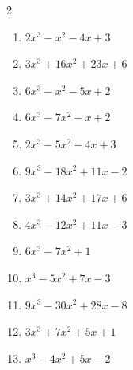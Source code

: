 \begin{multicols}{2}
\begin{enumerate}

  \item $2x^{3}-x^{2}-4x+3$


  \item $3x^{3}+16x^{2}+23x+6$

        \phantom{$=(3x+1)(x+2)(x+3)$}

\columnbreak %

  \item $6x^{3}-x^{2}-5x+2$

        \phantom{$=(2x-1)(3x-2)(x+1)$}

  \item $6x^{3}-7x^{2}-x+2$

        \phantom{$=(2x+1)(3x-2)(x-1)$}

  \item $2x^{3}-5x^{2}-4x+3$

        \phantom{$=(2x-1)(x+1)(x-3)$}

  \item $9x^{3}-18x^{2}+11x-2$

        \phantom{$=(3x-1)(3x-2)(x-1)$}

  \item $3x^{3}+14x^{2}+17x+6$

        \phantom{$=(3x+2)(x+1)(x+3)$}

\columnbreak %

\resetques

  \item $4x^{3}-12x^{2}+11x-3$

        \phantom{$=(2x-1)(2x-3)(x-1)$}

  \item $6x^{3}-7x^{2}+1$

        \phantom{$=(2x-1)(3x+1)(x-1)$}

  \item $x^{3}-5x^{2}+7x-3$


  \item $9x^{3}-30x^{2}+28x-8$


  \item $3x^{3}+7x^{2}+5x+1$


\columnbreak %

  \item $x^{3}-4x^{2}+5x-2$


\end{enumerate}
\end{multicols}
